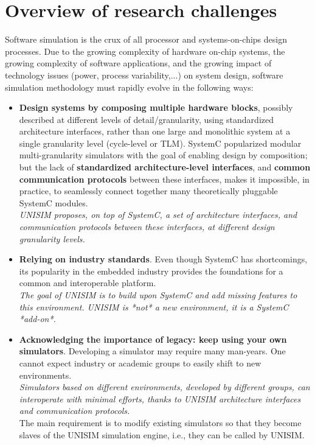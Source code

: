 \section{Overview of research challenges}

Software simulation is the crux of all processor and systems-on-chips design processes. Due to the growing complexity of hardware on-chip systems, the growing complexity of software applications, and the growing impact of technology issues (power, process variability,...) on system design, software simulation methodology must rapidly evolve in the following ways:

\begin{itemize}
\item \textbf{Design systems by composing multiple hardware blocks}, possibly described at different levels of detail/granularity, using standardized architecture interfaces, rather than one large and monolithic system at a single granularity level (cycle-level or TLM). SystemC popularized modular multi-granularity simulators with the goal of enabling design by composition; but the lack of \textbf{standardized architecture-level interfaces}, and \textbf{common communication protocols} between these interfaces, makes it impossible, in practice, to seamlessly connect together many theoretically pluggable SystemC modules.\\
\emph{UNISIM proposes, on top of SystemC, a set of architecture interfaces, and communication protocols between these interfaces, at different design granularity levels.}
\item \textbf{Relying on industry standards}. Even though SystemC has shortcomings, its popularity in the embedded industry provides the foundations for a common and interoperable platform.\\
\emph{The goal of UNISIM is to build upon SystemC and add missing features to this environment. UNISIM is *not* a new environment, it is a SystemC *add-on*.}
\item \textbf{Acknowledging the importance of legacy: keep using your own simulators}. Developing a simulator may require many man-years. One cannot expect industry or academic groups to easily shift to new environments.\\
\emph{Simulators based on different environments, developed by different groups, can interoperate with minimal efforts, thanks to UNISIM architecture interfaces and communication protocols.}\\
The main requirement is to modify existing simulators so that they become slaves of the UNISIM simulation engine, i.e., they can be called by UNISIM.

\end{itemize}
